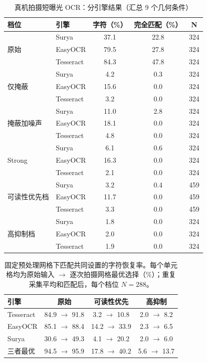 \begin{table}[!t]
\caption{真机拍摄短曝光 OCR：分引擎结果（汇总 9 个几何条件）}
\label{tab:real_ocr_engine}
\centering
\footnotesize
\setlength{\tabcolsep}{5.5pt}
\begin{tabular}{llccc}
\toprule
档位 & 引擎 & 字符（\%） & 完全匹配（\%） & N \\
\midrule
\multirow{3}{*}{原始}
 & Surya & 37.1 & 22.8 & 324 \\
 & EasyOCR & 79.5 & 27.8 & 324 \\
 & Tesseract & 84.3 & 47.8 & 324 \\
\midrule
\multirow{3}{*}{仅掩蔽}
 & Surya & 4.2 & 0.3 & 324 \\
 & EasyOCR & 15.6 & 0.0 & 324 \\
 & Tesseract & 3.2 & 0.0 & 324 \\
\midrule
\multirow{3}{*}{掩蔽加噪声}
 & Surya & 11.0 & 2.8 & 324 \\
 & EasyOCR & 18.1 & 0.0 & 324 \\
 & Tesseract & 4.8 & 0.0 & 324 \\
\midrule
\multirow{3}{*}{Strong}
 & Surya & 6.1 & 0.6 & 324 \\
 & EasyOCR & 16.3 & 0.0 & 324 \\
 & Tesseract & 2.1 & 0.0 & 324 \\
\midrule
\multirow{3}{*}{可读性优先档}
 & Surya & 3.2 & 0.4 & 459 \\
 & EasyOCR & 11.7 & 0.0 & 459 \\
 & Tesseract & 3.3 & 0.0 & 459 \\
\midrule
\multirow{3}{*}{高抑制档}
 & Surya & 1.8 & 0.0 & 324 \\
 & EasyOCR & 2.0 & 0.0 & 324 \\
 & Tesseract & 1.9 & 0.0 & 324 \\
\bottomrule
\end{tabular}
\end{table}

\begin{table}[!t]
\caption{固定预处理网格下匹配共同设置的字符恢复率。每个单元格均为原始输入 $\rightarrow$ 逐次拍摄网格最优选择（\%）；重复采集平均和匹配后，每个档位 $N=288$。}
\label{tab:preprocessing_grid}
\centering
\footnotesize
\setlength{\tabcolsep}{4.2pt}
\begin{tabular}{lccc}
\toprule
引擎 & 原始 & 可读性优先 & 高抑制 \\
\midrule
Tesseract & 84.9 $\rightarrow$ 91.8 & 3.2 $\rightarrow$ 10.8 & 2.0 $\rightarrow$ 8.2 \\
EasyOCR & 85.1 $\rightarrow$ 88.4 & 14.2 $\rightarrow$ 33.9 & 2.3 $\rightarrow$ 6.5 \\
Surya & 30.6 $\rightarrow$ 49.3 & 4.1 $\rightarrow$ 20.2 & 2.0 $\rightarrow$ 6.0 \\
三者最优 & 94.5 $\rightarrow$ 95.9 & 17.8 $\rightarrow$ 40.2 & 5.6 $\rightarrow$ 13.7 \\
\bottomrule
\end{tabular}
\end{table}

